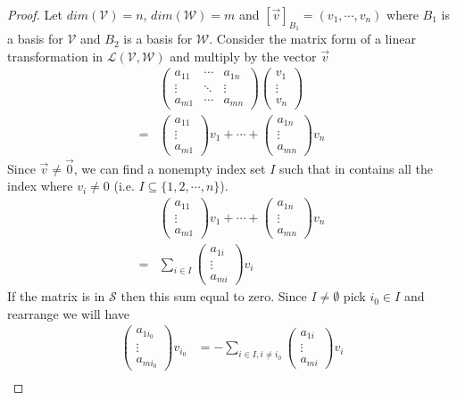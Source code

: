 \documentclass{article}
\begin{document}
\begin{proof}
Let $dim(\mathcal{V}) = n$, $dim(\mathcal{W}) = m$ and $[\vec{v}]_{B_1} = (v_1, \cdots, v_n)$ where $B_1$ is a basis for $\mathcal{V}$ and $B_2$ is a basis for $\mathcal{W}$. Consider the matrix form of a linear transformation in $\mathcal{L}(\mathcal{V}, \mathcal{W})$ and multiply by the vector $\vec{v}$
\begin{align*}
& \begin{pmatrix} a_{11} & \cdots & a_{1n} \\ \vdots & \ddots & \vdots \\ a_{m1} & \cdots & a_{mn} \end{pmatrix} \begin{pmatrix} v_1 \\ \vdots \\ v_n \end{pmatrix} \\
=& \begin{pmatrix} a_{11} \\ \vdots \\ a_{m1} \end{pmatrix} v_1 + \cdots + \begin{pmatrix} a_{1n} \\ \vdots \\ a_{mn} \end{pmatrix} v_n
\end{align*}
Since $\vec{v} \ne \vec{0}$, we can find a nonempty index set $I$ such that in contains all the index where $v_i \ne 0$ (i.e. $I \subseteq \{1, 2, \cdots ,n \}$).
\begin{align*}
&\begin{pmatrix} a_{11} \\ \vdots \\ a_{m1} \end{pmatrix} v_1 + \cdots + \begin{pmatrix} a_{1n} \\ \vdots \\ a_{mn} \end{pmatrix} v_n \\
=  &\sum_{i \in I} \begin{pmatrix} a_{1i} \\ \vdots \\ a_{mi} \end{pmatrix} v_i
\end{align*}
If the matrix is in $\mathcal{S}$ then this sum equal to zero. Since $I \ne \emptyset $ pick $i_0 \in I$ and rearrange we will have
\begin{align*}
 \begin{pmatrix} a_{1{i_0}} \\ \vdots \\ a_{m{i_0}} \end{pmatrix} v_{i_0} &= -\sum_{i \in I, i \ne i_0} \begin{pmatrix} a_{1i} \\ \vdots \\ a_{mi} \end{pmatrix} v_i \\

\end{align*}
\end{proof}
\end{document}

